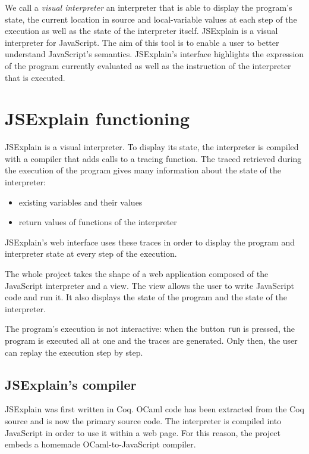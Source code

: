 \documentclass[twocolumn]{article}
\begin{document}
We call a \emph{visual interpreter} an interpreter that is able to display the
program's state, the current location in source and local-variable values at
each step of the execution as well as the state of the interpreter itself.
JSExplain is a visual interpreter for JavaScript. The aim of this tool is to
enable a user to better understand JavaScript's semantics. JSExplain's
interface highlights the expression of the program currently evaluated as well
as the instruction of the interpreter that is executed.

\section{JSExplain functioning}

JSExplain is a visual interpreter. To display its state, the interpreter is
compiled with a compiler that adds calls to a tracing function. The traced
retrieved during the execution of the program gives many information about the
state of the interpreter:

\begin{itemize}
  \item existing variables and their values
  \item return values of functions of the interpreter
\end{itemize}

JSExplain's web interface uses these traces in order to display the program and
interpreter state at every step of the execution.

The whole project takes the shape of a web application composed of the
JavaScript interpreter and a view. The view allows the user to write JavaScript
code and run it. It also displays the state of the program and the state of the
interpreter.

The program's execution is not interactive: when the button \texttt{run} is
pressed, the program is executed all at one and the traces are generated. Only
then, the user can replay the execution step by step.

\subsection{JSExplain's compiler}

JSExplain was first written in Coq. OCaml code has been extracted from the Coq
source and is now the primary source code. The interpreter is compiled into
JavaScript in order to use it within a web page. For this reason, the project
embeds a homemade OCaml-to-JavaScript compiler.
\end{document}
